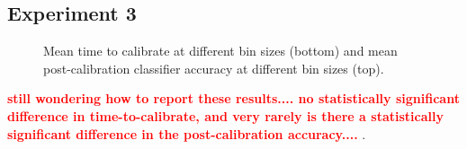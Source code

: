 \subsection{Experiment 3}

\begin{figure}[!h]
  \vspace{-0.2cm}
  \centering
   {}
  \caption{Mean time to calibrate at different bin sizes (bottom) and mean post-calibration classifier accuracy at different bin sizes (top).}
  \label{fig:fig2}
  \vspace{-0.1cm}
\end{figure}

\textcolor{red}{\bf still wondering how to report these results.... no statistically significant difference in time-to-calibrate, and very rarely is there a statistically significant difference in the post-calibration accuracy.... }.